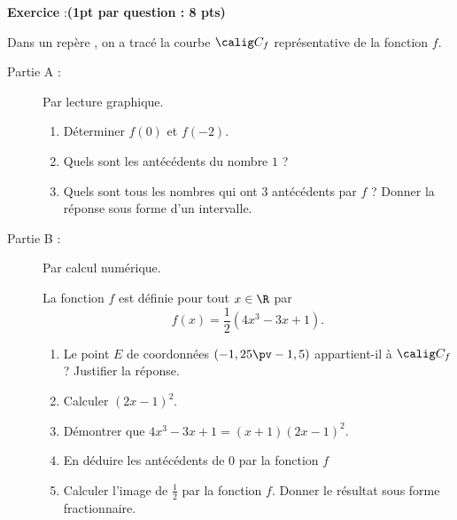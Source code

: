 \documentclass[10pt,french]{book}
\newcounter{exoc}
\newenvironment{exoc}[1]{%
  \refstepcounter{exoc}\textbf{Exercice \theexoc} :\hfill {\textbf{(#1)}}\par
  \medskip}%
{\medskip}
\begin{document}
\begin{exoc}{1pt par question : 8 pts}
Dans un repère \OIJ, on a tracé la courbe $\calig C_f$ représentative de la fonction $f$.

\begin{minipage}{0.6\textwidth}
    \begin{description}
        \item[Partie A :] Par lecture graphique.
           \begin{enumerate}
                \item Déterminer $f(0)$ et $f(-2)$.
                \item Quels sont les antécédents du nombre $1$ ?
                \item Quels sont tous les nombres qui ont $3$ antécédents par $f$ ? Donner la réponse sous forme d'un intervalle.
            \end{enumerate}
        \item[Partie B :] Par calcul numérique.\par La fonction $f$ est définie pour tout $x \in \R$ par \[f(x) =\frac 12 \left(4x^3 - 3x + 1\right).\]
            \begin{enumerate}
                \item Le point $E$ de coordonnées $(-1,25 \pv -1,5)$ appartient-il à $\calig C_f$ ? Justifier la réponse.
                \item Calculer $(2x - 1)^2$.
                \item Démontrer que $4x^3 - 3x + 1 = (x + 1)(2x - 1)^2$.
                \item En déduire les antécédents de $0$ par la fonction $f$
                \item Calculer l'image de $\frac 1 2$ par la fonction $f$. Donner le résultat sous forme fractionnaire.
            \end{enumerate}
    \end{description}
\end{minipage}\hfill
\begin{minipage}{0.35\textwidth}
    \begin{center}
    \end{center}
\end{minipage}
\end{exoc}
\end{document}
